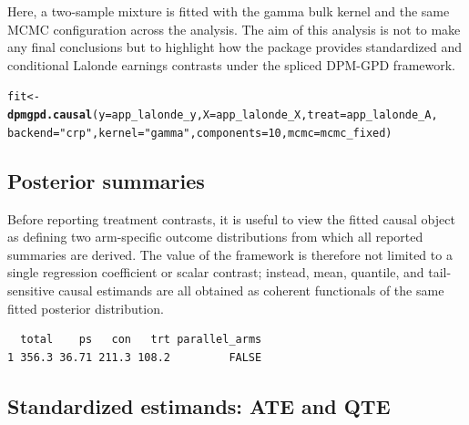 \documentclass[article]{jss}\usepackage[]{graphicx}\usepackage[]{xcolor}
\makeatletter
\newcommand{\hlnum}[1]{\textcolor[rgb]{0.686,0.059,0.569}{#1}}%
\newcommand{\hlsng}[1]{\textcolor[rgb]{0.192,0.494,0.8}{#1}}%
\newcommand{\hldef}[1]{\textcolor[rgb]{0.345,0.345,0.345}{#1}}%
\newcommand{\hlkwb}[1]{\textcolor[rgb]{0.69,0.353,0.396}{#1}}%
\newcommand{\hlkwc}[1]{\textcolor[rgb]{0.333,0.667,0.333}{#1}}%
\newcommand{\hlkwd}[1]{\textcolor[rgb]{0.737,0.353,0.396}{\textbf{#1}}}%
\newenvironment{kframe}{%
 \def\at@end@of@kframe{}%
 \ifinner\ifhmode%
  \def\at@end@of@kframe{\end{minipage}}%
  \begin{minipage}{\columnwidth}%
 \fi\fi%
 \def\FrameCommand##1{\hskip\@totalleftmargin \hskip-\fboxsep
 \colorbox{shadecolor}{##1}\hskip-\fboxsep
     \hskip-\linewidth \hskip-\@totalleftmargin \hskip\columnwidth}%
 \MakeFramed {\advance\hsize-\width
   \@totalleftmargin\z@ \linewidth\hsize
   \@setminipage}}%
 {\par\unskip\endMakeFramed%
 \at@end@of@kframe}
\newenvironment{knitrout}{}{} %
\makeatother
\begin{document}
Here, a two-sample mixture is fitted with the gamma bulk kernel and the
same MCMC configuration across the analysis. The aim of this analysis is
not to make any final conclusions but to highlight how the package
provides standardized and conditional Lalonde earnings contrasts under
the spliced DPM-GPD framework.

\begin{knitrout}\footnotesize
{}\color{fgcolor}\begin{kframe}
\begin{alltt}
\hldef{fit} \hlkwb{<-} \hlkwd{dpmgpd.causal}\hldef{(}\hlkwc{y} \hldef{= app_lalonde_y,} \hlkwc{X} \hldef{= app_lalonde_X,} \hlkwc{treat} \hldef{= app_lalonde_A,}
                      \hlkwc{backend} \hldef{=} \hlsng{"crp"}\hldef{,} \hlkwc{kernel} \hldef{=} \hlsng{"gamma"}\hldef{,} \hlkwc{components} \hldef{=} \hlnum{10}\hldef{,} \hlkwc{mcmc} \hldef{= mcmc_fixed)}
\end{alltt}
\end{kframe}
\end{knitrout}



\subsection{Posterior summaries}

Before reporting treatment contrasts, it is useful to view the fitted
causal object as defining two arm-specific outcome distributions from
which all reported summaries are derived. The value of the framework is
therefore not limited to a single regression coefficient or scalar
contrast; instead, mean, quantile, and tail-sensitive causal estimands
are all obtained as coherent functionals of the same fitted posterior
distribution.

\begin{knitrout}\footnotesize
{}\color{fgcolor}\begin{kframe}
\begin{verbatim}
  total    ps   con   trt parallel_arms
1 356.3 36.71 211.3 108.2         FALSE
\end{verbatim}
\end{kframe}
\end{knitrout}

\subsection{Standardized estimands: ATE and QTE}
\end{document}
